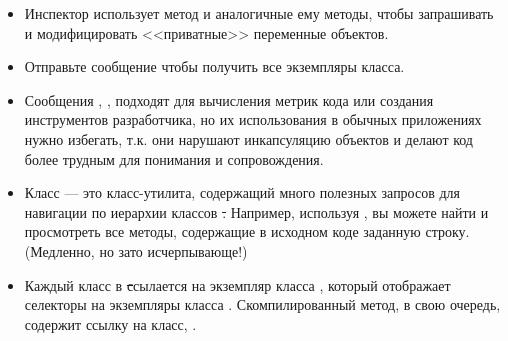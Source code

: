 \documentclass[a4paper,10pt,twoside]{book}
\begin{document}
\begin{itemize}
\item Инспектор использует метод  и аналогичные ему методы, чтобы запрашивать и модифицировать <<приватные>> переменные объектов.
\item Отправьте сообщение  чтобы получить все экземпляры класса.
\item Сообщения , ,  \etc подходят для вычисления метрик кода или создания инструментов разработчика, но их использования в обычных приложениях нужно избегать, т.к. они нарушают инкапсуляцию объектов и делают код более трудным для понимания и сопровождения.
\item Класс  --- это класс-утилита, содержащий много полезных запросов для навигации по иерархии классов \st. Например, используя , вы можете найти и просмотреть все методы, содержащие в исходном коде заданную строку. (Медленно, но зато исчерпывающе!)
\item Каждый класс в \st ссылается на экземпляр класса , который отображает селекторы на экземпляры класса . Скомпилированный метод, в свою очередь, содержит ссылку на класс, . 

\end{itemize}
\end{document}
